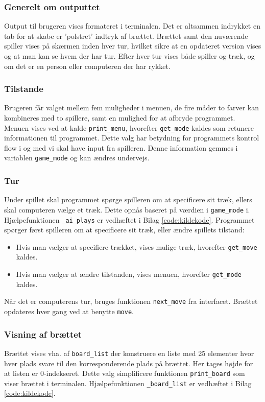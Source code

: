 \documentclass{article}
\begin{document}
\subsubsection{Generelt om outputtet}
Output til brugeren vises formateret i terminalen. Det er altsammen indrykket en tab
for at skabe er 'polstret' indtryk af brættet. Brættet samt den nuværende spiller 
vises på skærmen inden hver tur, hvilket sikre at en opdateret version vises og
at man kan se hvem der har tur. Efter hver tur vises både spiller og træk, og om det er
en person eller computeren der har rykket.
\subsubsection{Tilstande}
Brugeren får valget mellem fem muligheder i menuen, de fire måder to farver kan 
kombineres med to spillere, samt en mulighed for at afbryde programmet.
\newline
Menuen vises ved at kalde \texttt{print\_menu}, hvorefter \texttt{get\_mode} kaldes som retunere informationen til programmet.
Dette valg har betydning for programmets kontrol flow i og med vi skal have input fra spilleren.
Denne information gemmes i variablen \texttt{game\_mode} og kan ændres undervejs.

\subsubsection{Tur}
Under spillet skal programmet spørge spilleren om at specificere sit træk, ellers skal computeren
vælge et træk. 
Dette opnås baseret på værdien i \texttt{game\_mode} i. Hjælpefunktionen \texttt{\_ai\_plays}
er vedhæftet i Bilag \ref{code:kildekode}.
\bigbreak
Programmet spørger først spilleren om at specificere sit træk, eller ændre spillets tilstand:
\begin{itemize}
    \item Hvis man vælger at specifiere trækket, vises mulige træk, hvorefter \texttt{get\_move} kaldes.
    \item Hvis man vælger at ændre tilstanden, vises menuen, hvorefter \texttt{get\_mode} kaldes.
\end{itemize}
Når det er computerens tur, bruges funktionen \texttt{next\_move} fra interfacet. Brættet opdateres hver gang
ved at benytte \texttt{move}.

\subsubsection{Visning af brættet}
Brættet vises vha. af \texttt{board\_list} der konstruere en liste med
25 elementer hvor hver plads svare til den korresponderende plads på brættet. Her 
tages højde for at listen er 0-indekseret.
Dette valg simplificere funktionen \texttt{print\_board} som viser brættet i terminalen.
Hjælpefunktionen \texttt{\_board\_list} er vedhæftet i Bilag \ref{code:kildekode}.
\end{document}
